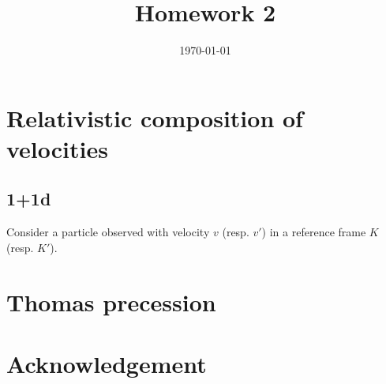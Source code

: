 \documentclass[10pt, a4paper]{article}
\title{Homework 2} %
\author{\PA} %
\date{\today} %
\begin{document}
\maketitlepage

\maketableofcontents

\section{Relativistic composition of velocities}
\subsection{1+1d} 
Consider a particle observed with velocity $v$ (resp. $v'$) in a reference frame $K$ (resp. $K'$). 
\subsection{}
\subsection{}
\subsection{}
\subsection{}
\subsection{}

\section{Thomas precession}
\subsection{}
\subsection{}
\subsection{}
\subsection{}
\subsection{}
\subsection{}

\section{Acknowledgement}

\makereferences


\end{document}
